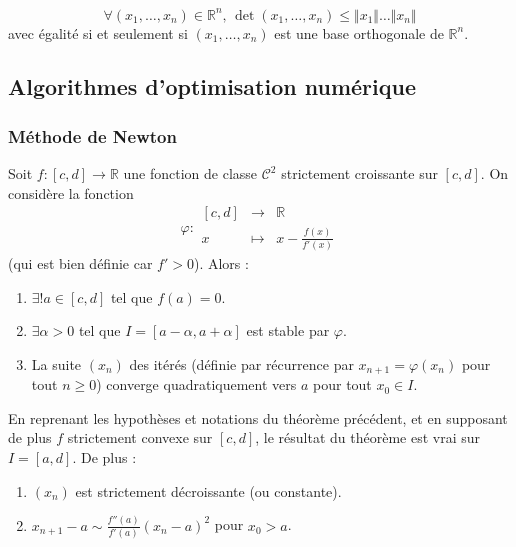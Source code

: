 	\begin{application}
		\[ \forall (x_1, \dots, x_n) \in \mathbb{R}^n, \, \det(x_1, \dots, x_n) \leq \Vert x_1 \Vert \dots \Vert x_n \Vert \]
		avec égalité si et seulement si $(x_1, \dots, x_n)$ est une base orthogonale de $\mathbb{R}^n$.
	\end{application}

	\subsection{Algorithmes d'optimisation numérique}

	\subsubsection{Méthode de Newton}


	\begin{theorem}
		Soit $f : [c, d] \rightarrow \mathbb{R}$ une fonction de classe $\mathcal{C}^2$ strictement croissante sur $[c, d]$. On considère la fonction
		\[ \varphi :
		\begin{array}{ccc}
			[c, d] &\rightarrow& \mathbb{R} \\
			x &\mapsto& x - \frac{f(x)}{f'(x)}
		\end{array}
		\]
		(qui est bien définie car $f' > 0$). Alors :
		\begin{enumerate}[label=(\roman*)]
			\item $\exists! a \in [c, d]$ tel que $f(a) = 0$.
			\item $\exists \alpha > 0$ tel que $I = [a - \alpha, a + \alpha]$ est stable par $\varphi$.
			\item La suite $(x_n)$ des itérés (définie par récurrence par $x_{n+1} = \varphi(x_n)$ pour tout $n \geq 0$) converge quadratiquement vers $a$ pour tout $x_0 \in I$.
		\end{enumerate}
	\end{theorem}

	\begin{corollary}
		En reprenant les hypothèses et notations du théorème précédent, et en supposant de plus $f$ strictement convexe sur $[c, d]$, le résultat du théorème est vrai sur $I = [a, d]$. De plus :
		\begin{enumerate}[label=(\roman*)]
			\item $(x_n)$ est strictement décroissante (ou constante).
			\item $x_{n+1} - a \sim \frac{f''(a)}{f'(a)} (x_n - a)^2$ pour $x_0 > a$.
		\end{enumerate}
	\end{corollary}

